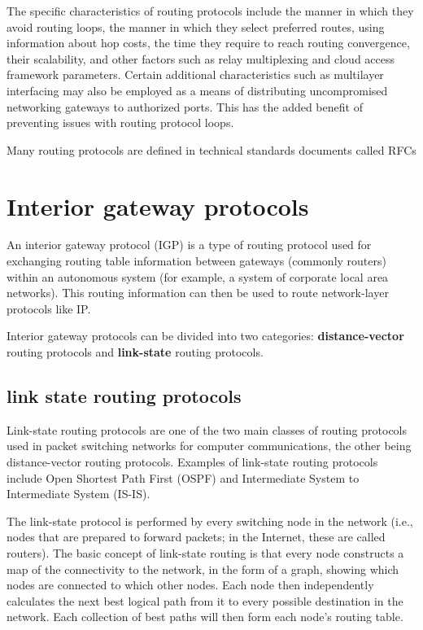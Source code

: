 \documentclass[a4paper,12pt]{book}
\begin{document}
The specific characteristics of routing protocols include the manner in which they avoid routing loops, the manner in which they select preferred routes, using information about hop costs, the time they require to reach routing convergence, their scalability, and other factors such as relay multiplexing and cloud access framework parameters. Certain additional characteristics such as multilayer interfacing may also be employed as a means of distributing uncompromised networking gateways to authorized ports. This has the added benefit of preventing issues with routing protocol loops.

Many routing protocols are defined in technical standards documents called RFCs

\section{Interior gateway protocols}
An interior gateway protocol (IGP) is a type of routing protocol used for exchanging routing table information between gateways (commonly routers) within an autonomous system (for example, a system of corporate local area networks). This routing information can then be used to route network-layer protocols like IP.

Interior gateway protocols can be divided into two categories: \textbf{distance-vector} routing protocols and \textbf{link-state} routing protocols.

\subsection{link state routing protocols}
Link-state routing protocols are one of the two main classes of routing protocols used in packet switching networks for computer communications, the other being distance-vector routing protocols. Examples of link-state routing protocols include Open Shortest Path First (OSPF) and Intermediate System to Intermediate System (IS-IS).

The link-state protocol is performed by every switching node in the network (i.e., nodes that are prepared to forward packets; in the Internet, these are called routers). The basic concept of link-state routing is that every node constructs a map of the connectivity to the network, in the form of a graph, showing which nodes are connected to which other nodes. Each node then independently calculates the next best logical path from it to every possible destination in the network. Each collection of best paths will then form each node's routing table.
\end{document}

